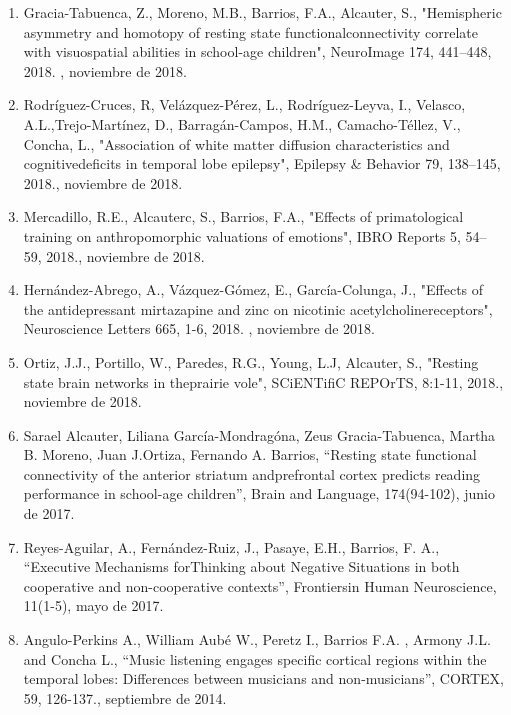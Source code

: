 \begin{enumerate}
\item Gracia-Tabuenca, Z., Moreno, M.B., Barrios, F.A., Alcauter, S., "Hemispheric asymmetry and homotopy of resting state 
functionalconnectivity correlate with visuospatial abilities in school-age children", NeuroImage 174, 441–448, 2018. , 
   noviembre de 2018.

\item Rodríguez-Cruces, R, Velázquez-Pérez, L., Rodríguez-Leyva, I., Velasco, A.L.,Trejo-Martínez, D., Barragán-Campos, H.M., 
Camacho-Téllez, V., Concha, L., "Association of white matter diffusion characteristics and cognitivedeficits in temporal lobe 
epilepsy", Epilepsy \& Behavior 79, 138–145, 2018.,    noviembre de 2018.

\item Mercadillo, R.E., Alcauterc, S., Barrios, F.A., "Effects of primatological training on anthropomorphic valuations of 
emotions", IBRO Reports 5, 54–59, 2018.,    noviembre de 2018.

\item Hernández-Abrego, A., Vázquez-Gómez, E., García-Colunga, J., "Effects of the antidepressant mirtazapine and zinc on 
nicotinic acetylcholinereceptors", Neuroscience Letters 665, 1-6, 2018. ,    noviembre de 
2018.

\item Ortiz, J.J., Portillo, W., Paredes, R.G., Young, L.J, Alcauter, S., "Resting state brain networks in theprairie vole", 
SCiENTifiC REPOrTS, 8:1-11, 2018.,    noviembre de 2018.

\item Sarael Alcauter, Liliana García-Mondragóna, Zeus Gracia-Tabuenca, Martha B. Moreno, Juan J.Ortiza, Fernando A. Barrios, 
“Resting state functional connectivity of the anterior striatum andprefrontal cortex predicts reading performance in 
school-age children”, Brain and Language, 174(94-102),    junio de 2017.

\item Reyes-Aguilar, A., Fernández-Ruiz, J., Pasaye, E.H., Barrios, F. A., “Executive Mechanisms forThinking about Negative 
Situations in both cooperative and non-cooperative contexts”, Frontiersin Human Neuroscience, 11(1-5), mayo de 2017.

\item Angulo-Perkins A., William Aubé W., Peretz I., Barrios F.A. , Armony J.L. and Concha L., “Music listening engages 
specific cortical regions within the temporal lobes: Differences between musicians and non-musicians”, CORTEX, 59, 126-137., 
   septiembre de 2014.


\end{enumerate}
